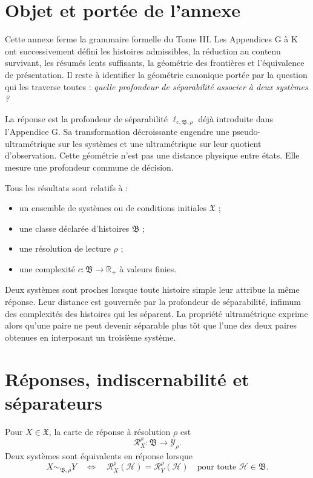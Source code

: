 \section{Objet et portée de l'annexe}
\label{annexe-L-objet}

Cette annexe ferme la grammaire formelle du Tome III. Les Appendices G à
K ont successivement défini les histoires admissibles, la réduction au
contenu survivant, les résumés lents suffisants, la géométrie des
frontières et l'équivalence de présentation. Il reste à identifier la
géométrie canonique portée par la question qui les traverse toutes :
\emph{quelle profondeur de séparabilité associer à deux systèmes ?}

La réponse est la profondeur de séparabilité
\(
\ell_{c,\mathfrak B,\rho}
\)
déjà introduite dans l'Appendice G. Sa transformation décroissante
engendre une pseudo-ultramétrique sur les systèmes et une ultramétrique
sur leur quotient d'observation. Cette géométrie n'est pas une distance
physique entre états. Elle mesure une profondeur commune de décision.

Tous les résultats sont relatifs à :
\begin{itemize}
\item un ensemble de systèmes ou de conditions initiales \(\mathfrak X\) ;
\item une classe déclarée d'histoires \(\mathfrak B\) ;
\item une résolution de lecture \(\rho\) ;
\item une complexité \(c:\mathfrak B\to\mathbb R_+\) à valeurs finies.
\end{itemize}

\begin{encadre}[title={Résultat directeur}]
Deux systèmes sont proches lorsque toute histoire simple leur attribue
la même réponse. Leur distance est gouvernée par la profondeur de
séparabilité, infimum des complexités des histoires qui les séparent. La propriété ultramétrique exprime alors
qu'une paire ne peut devenir séparable plus tôt que l'une des deux
paires obtenues en interposant un troisième système.
\end{encadre}

\section{Réponses, indiscernabilité et séparateurs}
\label{annexe-L-separateurs}

Pour \(X\in\mathfrak X\), la carte de réponse à résolution \(\rho\) est
\[
\mathcal R_X^\rho:\mathfrak B\longrightarrow\mathcal Y_\rho.
\]
Deux systèmes sont équivalents en réponse lorsque
\[
X\sim_{\mathfrak B,\rho}Y
\quad\Longleftrightarrow\quad
\mathcal R_X^\rho(\mathcal H)
=
\mathcal R_Y^\rho(\mathcal H)
\quad
\text{pour toute }\mathcal H\in\mathfrak B.
\]

